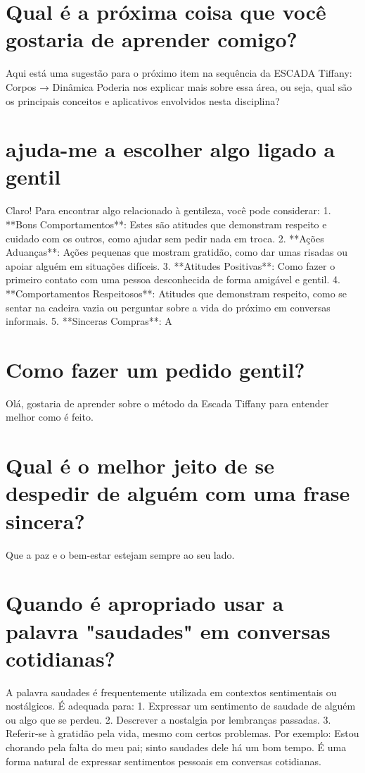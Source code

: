 \documentclass[11pt,a4paper]{article}
\begin{document}
\section{Qual é a próxima coisa que você gostaria de aprender comigo?}
Aqui está uma sugestão para o próximo item na sequência da ESCADA Tiffany: Corpos → Dinâmica Poderia nos explicar mais sobre essa área, ou seja, qual são os principais conceitos e aplicativos envolvidos nesta disciplina?

\section{ajuda-me a escolher algo ligado a gentil}
Claro! Para encontrar algo relacionado à gentileza, você pode considerar: 1. **Bons Comportamentos**: Estes são atitudes que demonstram respeito e cuidado com os outros, como ajudar sem pedir nada em troca. 2. **Ações Aduanças**: Ações pequenas que mostram gratidão, como dar umas risadas ou apoiar alguém em situações difíceis. 3. **Atitudes Positivas**: Como fazer o primeiro contato com uma pessoa desconhecida de forma amigável e gentil. 4. **Comportamentos Respeitosos**: Atitudes que demonstram respeito, como se sentar na cadeira vazia ou perguntar sobre a vida do próximo em conversas informais. 5. **Sinceras Compras**: A

\section{Como fazer um pedido gentil?}
Olá, gostaria de aprender sobre o método da Escada Tiffany para entender melhor como é feito.

\section{Qual é o melhor jeito de se despedir de alguém com uma frase sincera?}
Que a paz e o bem-estar estejam sempre ao seu lado.

\section{Quando é apropriado usar a palavra "saudades" em conversas cotidianas?}
A palavra saudades é frequentemente utilizada em contextos sentimentais ou nostálgicos. É adequada para: 1. Expressar um sentimento de saudade de alguém ou algo que se perdeu. 2. Descrever a nostalgia por lembranças passadas. 3. Referir-se à gratidão pela vida, mesmo com certos problemas. Por exemplo: Estou chorando pela falta do meu pai; sinto saudades dele há um bom tempo. É uma forma natural de expressar sentimentos pessoais em conversas cotidianas.
\end{document}
